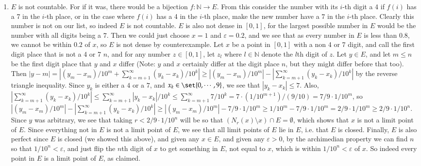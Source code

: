 \documentclass[12pt]{article}
\def\mbb#1{\mathbb{#1}}
\def\bN{\mbb{N}}
\def \ve{\varepsilon}
\theoremstyle{definition}
\theoremstyle{remark}
\begin{document}
\begin{enumerate}[leftmargin=\labelsep]
		\item $E$ is not countable. For if it was, there would be a bijection $f: \bN \to E$. From this consider the number with its $i$-th digit a 4 if $f(i)$ has a 7 in the $i$-th place, or in the case where $f(i)$ has a 4 in the $i$-th place, make the new number have a $7$ in the $i$-th place. Clearly this number is not on our list, so indeed $E$ is not countable. $E$ is also not dense in $[0, 1]$, for the largest possible number in $E$ would be the number with all digits being a $7$. Then we could just choose $x=1$ and $\ve = 0.2$, and we see that as every number in $E$ is less than $0.8$, we cannot be within $0.2$ of $x$, so $E$ is not dense by counterexample. Let $x$ be a point in $[0, 1]$ with a non 4 or 7 digit, and call the first digit place that is not a 4 or 7 $n$, and for any number $z \in [0, 1]$, let $z_l$ where $l\in \bN$ denote the $l$th digit of $z$. Let $y \in E$, and let $m \leq n$ be the first digit place that $y$ and $x$ differ (Note: $y$ and $x$ certainly differ at the digit place $n$, but they might differ before that too). Then $|y-m| = |(y_m - x_m)/10^m + \sum_{k=m+1}^\infty (y_k-x_k)/10^k| \geq |(y_m-x_m)/10^m| - |\sum_{k=m+1}^\infty (y_k-x_k)/10^k|$ by the reverse triangle inequality. Since $y_k$ is either a $4$ or a $7$, and $x_k \in \set{0, \cdots, 9}$, we see that $|y_k-x_k| \leq 7$. Also, $|\sum_{k=m+1}^\infty (y_k-x_k)/10^k| \leq \sum_{k=m+1}^\infty |y_k-x_k|/10^k \leq \sum_{k=m+1}^\infty 7/10^k = 7 \cdot (1/10^{m+1}) / (9/10) = 7/9 \cdot 1/10^m$, so $|(y_m-x_m)/10^m| - |\sum_{k=m+1}^\infty (y_k-x_k)/10^k| \geq |(y_m-x_m)/10^m| - 7/9 \cdot 1/10^m \geq 1/10^m - 7/9 \cdot 1/10^m = 2/9 \cdot 1/10^m \geq 2/9 \cdot 1/10^n$. Since $y$ was arbitrary, we see that taking $r < 2/9 \cdot 1/10^n$ will be so that $(N_r(x) \setminus x) \cap E = \emptyset$, which shows that $x$ is not a limit point of $E$. Since everything not in $E$ is not a limit point of $E$, we see that all limit points of $E$ lie in $E$, i.e. that $E$ is closed. Finally, $E$ is also perfect since $E$ is closed (we showed this above), and given any $x \in E$, and given any $\ve > 0$, by the archimedian property we can find $n$ so that $1/10^n < \ve$, and just flip the $n$th digit of $x$ to get something in $E$, not equal to $x$, which is within $1/10^n < \ve$ of $x$. So indeed every point in $E$ is a limit point of $E$, as claimed.
		

\end{enumerate}
\end{document}
